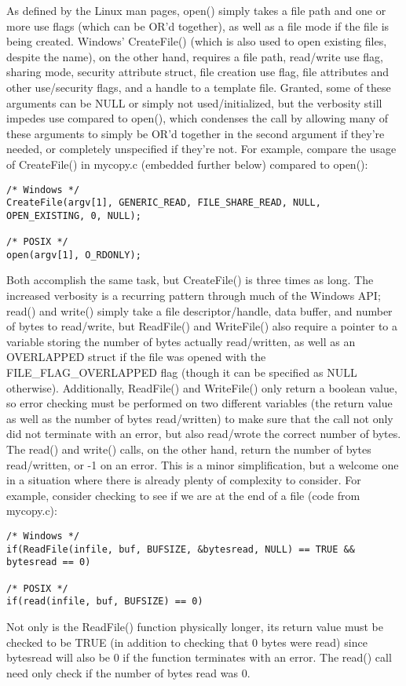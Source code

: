 \documentclass[letterpaper,10pt,fleqn]{article}
\numberwithin{equation}{section}
\begin{document}
As defined by the Linux man pages, open() simply takes a file path and one or more use flags (which can be OR'd together), as well as a file mode if the file is being created.  Windows' CreateFile() (which is also used to open existing files, despite the name), on the other hand, requires a file path, read/write use flag, sharing mode, security attribute struct, file creation use flag, file attributes and other use/security flags, and a handle to a template file.  Granted, some of these arguments can be NULL or simply not used/initialized, but the verbosity still impedes use compared to open(), which condenses the call by allowing many of these arguments to simply be OR'd together in the second argument if they're needed, or completely unspecified if they're not.  For example, compare the usage of CreateFile() in mycopy.c (embedded further below) compared to open():
\begin{verbatim}
/* Windows */
CreateFile(argv[1], GENERIC_READ, FILE_SHARE_READ, NULL, OPEN_EXISTING, 0, NULL);

/* POSIX */
open(argv[1], O_RDONLY);
\end{verbatim}
Both accomplish the same task, but CreateFile() is three times as long.  The increased verbosity is a recurring pattern through much of the Windows API; read() and write() simply take a file descriptor/handle, data buffer, and number of bytes to read/write, but ReadFile() and WriteFile() also require a pointer to a variable storing the number of bytes actually read/written, as well as an OVERLAPPED struct if the file was opened with the FILE\_FLAG\_OVERLAPPED flag (though it can be specified as NULL otherwise).  Additionally, ReadFile() and WriteFile() only return a boolean value, so error checking must be performed on two different variables (the return value as well as the number of bytes read/written) to make sure that the call not only did not terminate with an error, but also read/wrote the correct number of bytes.  The read() and write() calls, on the other hand, return the number of bytes read/written, or -1 on an error.  This is a minor simplification, but a welcome one in a situation where there is already plenty of complexity to consider.  For example, consider checking to see if we are at the end of a file (code from mycopy.c):
\begin{verbatim}
/* Windows */
if(ReadFile(infile, buf, BUFSIZE, &bytesread, NULL) == TRUE && bytesread == 0)

/* POSIX */
if(read(infile, buf, BUFSIZE) == 0)
\end{verbatim}
Not only is the ReadFile() function physically longer, its return value must be checked to be TRUE (in addition to checking that 0 bytes were read) since bytesread will also be 0 if the function terminates with an error.  The read() call need only check if the number of bytes read was 0.
\end{document}
